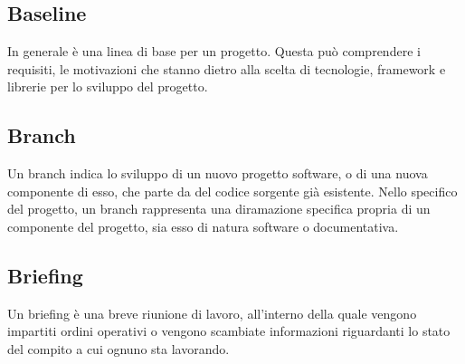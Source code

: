
\subsection*{Baseline}
In generale è una linea di base per un progetto. Questa può comprendere i requisiti, le motivazioni che stanno dietro alla scelta di tecnologie, framework e librerie per lo sviluppo del progetto.
\subsection*{Branch}
Un branch indica lo sviluppo di un nuovo progetto software, o di una nuova componente di esso, che parte da del codice sorgente già esistente. Nello specifico del progetto, un branch rappresenta una diramazione specifica propria di un componente del progetto, sia esso di natura software o documentativa.
\subsection*{Briefing}
Un briefing è una breve riunione di lavoro, all'interno della quale vengono impartiti ordini operativi o vengono scambiate informazioni riguardanti lo stato del compito a cui ognuno sta lavorando.

